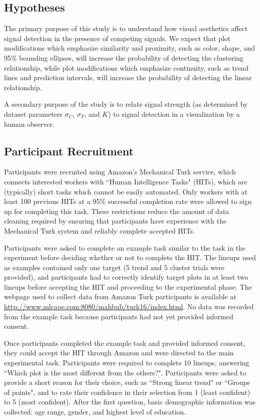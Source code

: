\documentclass[11pt]{isuthesis}\usepackage[]{graphicx}\usepackage[]{color}
\begin{document}
\subsection{Hypotheses}
The primary purpose of this study is to understand how visual aesthetics affect signal detection in the presence of competing signals. We expect that plot modifications which emphasize similarity and proximity, such as color, shape, and 95\% bounding ellipses, will increase the probability of detecting the clustering relationship, while plot modifications which emphasize continuity, such as trend lines and prediction intervals, will increase the probability of detecting the linear relationship. 

A secondary purpose of the study is to relate signal strength (as determined by dataset parameters $\sigma_C$, $\sigma_T$, and $K$) to signal detection in a visualization by a human observer.

\subsection{Participant Recruitment}
Participants were recruited using Amazon's Mechanical Turk service\citep{amazon}, which connects interested workers with ``Human Intelligence Tasks" (HITs), which are (typically) short tasks which cannot be easily automated. Only workers with at least 100 previous HITs at a 95\% successful completion rate were allowed to sign up for completing this task. These restrictions reduce the amount of data cleaning required by ensuring that participants have experience with the Mechanical Turk system and reliably complete accepted HITs. 

Participants were asked to complete an example task similar to the task in the experiment before deciding whether or not to complete the HIT. The lineups used as examples contained only one target (5 trend and 5 cluster trials were provided), and participants had to correctly identify target plots in at least two lineups before accepting the HIT and proceeding to the experimental phase. The webpage used to collect data from Amazon Turk participants is available at \url{http://www.mlcape.com:8080/mahbub/turk16/index.html}. No data was recorded from the example task because participants had not yet provided informed consent. 

Once participants completed the example task and provided informed consent, they could accept the HIT through Amazon and were directed to the main experimental task. 
Participants were required to complete 10 lineups, answering ``Which plot is the most different from the others?". Participants were asked to provide a short reason for their choice, such as ``Strong linear trend" or ``Groups of points", and to rate their confidence in their selection from 1 (least confident) to 5 (most confident). 
After the first question, basic demographic information was collected: age range, gender, and highest level of education. 
\end{document}
